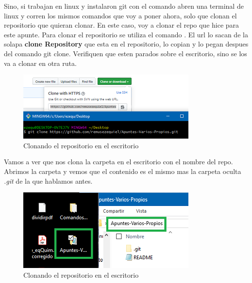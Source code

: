 \documentclass[10pt,journal,compsoc]{IEEEtran}
\begin{document}
Sino, si trabajan en linux y instalaron git con el comando \textit{\color{Green}{sudo apt-get install git}} abren una terminal de linux y corren los mismos comandos que voy a poner ahora, solo que clonan el repositorio que quieran clonar. En este caso, voy a clonar el repo que hice para este apunte. Para clonar el repositorio se utiliza el comando \textit{\color{Blue}{git clone urlDelRepositorio}}. El url lo sacan de la solapa \textbf{clone Repository} que esta en el repositorio, lo copian y lo pegan despues del comando git clone. Verifiquen que esten parados sobre el escritorio, sino se los va a clonar en otra ruta.

\begin{figure}[H]
  \begin{center}
	 \includegraphics{figuras/clone.png}
	 \centering
	 \renewcommand{\arraystretch}{1.3}
	 \caption{Clonando el repositorio en el escritorio}
  \end{center}
\end{figure}

Vamos a ver que nos clona la carpeta en el escritorio con el nombre del repo. Abrimos la carpeta y vemos que el contenido es el mismo mas la carpeta oculta \textit{.git} de la que hablamos antes.

\begin{figure}[H]
  \begin{center}
	 \includegraphics{figuras/carpeta.png}
	 \centering
	 \renewcommand{\arraystretch}{1.3}
	 \caption{Clonando el repositorio en el escritorio}
  \end{center}
\end{figure}
\end{document}
